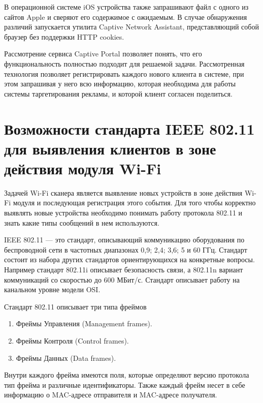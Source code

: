 В операционной системе iOS устройства также запрашивают файл с одного из сайтов Apple и сверяют его содержимое с ожидаемым. В случае обнаружения различий запускается утилита Captive Network Assistant, представляющий собой браузер без поддержки HTTP cookies.

Рассмотрение сервиса Captive Portal позволяет понять, что его функциональность полностью подходит для решаемой задачи. Рассмотренная технология позволяет регистрировать каждого нового клиента в системе, при этом запрашивая у него всю информацию, которая необходима для работы системы таргетирования рекламы, и которой клиент согласен поделиться.


\section{Возможности стандарта IEEE 802.11 для выявления клиентов в зоне действия модуля Wi-Fi}

Задачей Wi-Fi сканера является выявление новых устройств в зоне действия Wi-Fi модуля и последующая регистрация этого события. Для того чтобы корректно выявлять новые устройства необходимо понимать работу протокола 802.11 и знать какие типы сообщений в нем используются.

IEEE 802.11 --- это стандарт, описывающий коммуникацию оборудования по беспроводной сети в частотных диапазонах 0,9; 2,4; 3,6; 5 и 60 ГГц\cite{iee802_11}. Стандарт состоит из набора других стандартов ориентирующихся на конкретные вопросы. Например стандарт 802.11i описывает безопасность связи, а 802.11n вариант коммуникаций со скоростью до 600 МБит/с. Стандарт описывает работу на канальном уровне модели OSI.

Стандарт 802.11 описывает три типа фреймов

\begin{enumerate}
	\item Фреймы Управления (Management frames).
	\item Фреймы Контроля (Control frames).
	\item Фреймы Данных (Data frames).
\end{enumerate}

Внутри каждого фрейма имеются поля, которые определяют версию протокола тип фрейма и различные идентификаторы. Также каждый фрейм несет в себе информацию о MAC-адресе отправителя и MAC-адресе получателя.

